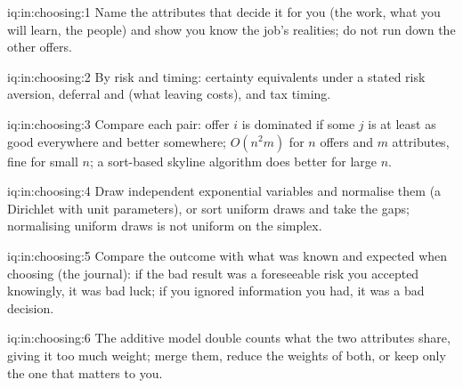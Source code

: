 \begin{solution}{iq:in:choosing:1}
Name the attributes that decide it for you (the work, what you will learn, the people) and show you know the job's
realities; do not run down the other offers.
\end{solution}

\begin{solution}{iq:in:choosing:2}
By risk and timing: certainty equivalents under a stated risk aversion, deferral and  (what leaving costs), and
tax timing.
\end{solution}

\begin{solution}{iq:in:choosing:3}
Compare each pair: offer $i$ is dominated if some $j$ is at least as good everywhere and better somewhere; $O(n^2m)$ for
$n$ offers and $m$ attributes, fine for small $n$; a sort-based skyline algorithm does better for large $n$.
\end{solution}

\begin{solution}{iq:in:choosing:4}
Draw independent exponential variables and normalise them (a Dirichlet with unit parameters), or sort uniform draws and
take the gaps; normalising uniform draws is not uniform on the simplex.
\end{solution}

\begin{solution}{iq:in:choosing:5}
Compare the outcome with what was known and expected when choosing (the journal): if the bad result was a foreseeable
risk you accepted knowingly, it was bad luck; if you ignored information you had, it was a bad decision.
\end{solution}

\begin{solution}{iq:in:choosing:6}
The additive model double counts what the two attributes share, giving it too much weight; merge them, reduce the weights
of both, or keep only the one that matters to you.
\end{solution}
